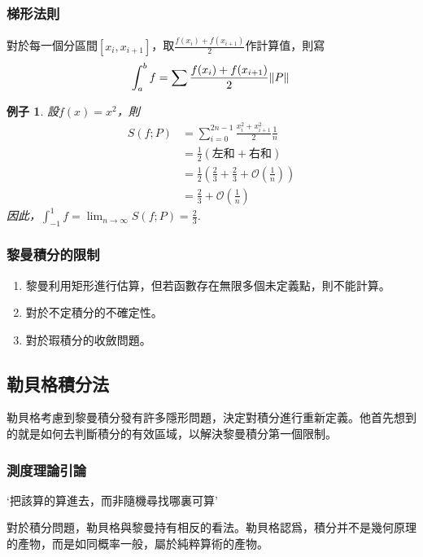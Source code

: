 \documentclass[12pt]{article}
\newtheorem*{example}{例子}
\begin{document}
    \subsubsection*{梯形法則}
    對於每一個分區間$[x_i,x_{i+1}]$，取$\frac{f(x_i)+f(x_{i+1})}{2}$作計算值，則寫$$\int_a^b f=\sum \frac{f(x_i)+f(x_{i+1})}{2}\norm*{P}$$

    \begin{example}
        設$f(x)=x^2$，則\begin{align*}
            S(f;P)&=\sum_{i=0}^{2n-1} \frac{x_i^2+x_{i+1}^2}{2} \frac{1}{n}\\
            &=\frac{1}{2}(\textrm{左和}+\textrm{右和})\\
            &=\frac{1}{2}(\frac{2}{3}+\frac{2}{3}+\mathcal{O}(\frac{1}{n}))\\
            &=\frac{2}{3}+\mathcal{O}(\frac{1}{n})
        \end{align*}
        因此，$\displaystyle\int_{-1}^1 f = \lim_{n\to \infty}S(f;P)=\frac{2}{3}$.
    \end{example}

    \subsubsection*{黎曼積分的限制}

    \begin{enumerate}
        \item 黎曼利用矩形進行估算，但若函數存在無限多個未定義點，則不能計算。
        \item 對於不定積分的不確定性。
        \item 對於瑕積分的收斂問題。
    \end{enumerate}
    \subsection*{勒貝格積分法}

    勒貝格考慮到黎曼積分發有許多隱形問題，決定對積分進行重新定義。他首先想到的就是如何去判斷積分的有效區域，以解決黎曼積分第一個限制。

    \subsubsection*{測度理論引論}

    `把該算的算進去，而非隨機尋找哪裏可算'

    對於積分問題，勒貝格與黎曼持有相反的看法。勒貝格認爲，積分并不是幾何原理的產物，而是如同概率一般，屬於純粹算術的產物。
\end{document}
